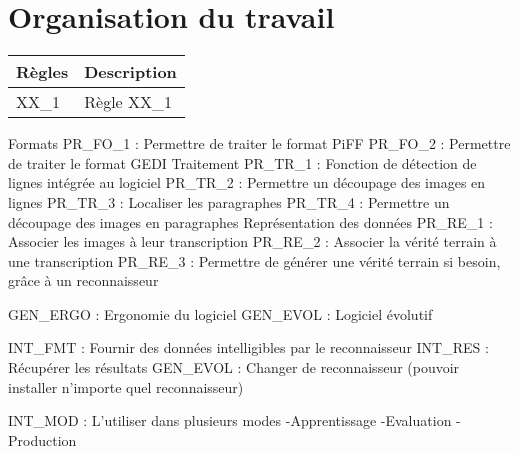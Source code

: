\section{Organisation du travail}

\begin{mdframed}[frametitle={Figure N : LOT 1 - X}, innerbottommargin=10]
\begin{center}
\begin{tabular}{ | l | l | }
\hline
{\textbf{Règles}}   &   {\textbf{Description}} \\ \hline
{XX\_1}              &   {Règle XX\_1} \\ \hline
\end{tabular}
\end{center}
\end{mdframed}

Formats
PR\_FO\_1 : Permettre de traiter le format PiFF
PR\_FO\_2 : Permettre de traiter le format GEDI
Traitement
PR\_TR\_1 : Fonction de détection de lignes intégrée au logiciel
PR\_TR\_2 : Permettre un découpage des images en lignes
PR\_TR\_3 : Localiser les paragraphes
PR\_TR\_4 : Permettre un découpage des images en paragraphes
Représentation des données
PR\_RE\_1 : Associer les images à leur transcription
PR\_RE\_2 : Associer la vérité terrain à une transcription
PR\_RE\_3 : Permettre de générer une vérité terrain si besoin, grâce à un reconnaisseur

GEN\_ERGO : Ergonomie du logiciel
GEN\_EVOL : Logiciel évolutif

INT\_FMT : Fournir des données intelligibles par le reconnaisseur
INT\_RES : Récupérer les résultats
GEN\_EVOL : Changer de reconnaisseur (pouvoir installer n’importe quel reconnaisseur)

INT\_MOD : L’utiliser dans plusieurs modes
-Apprentissage
-Evaluation
-Production